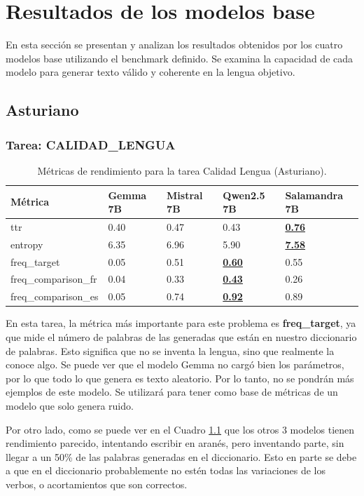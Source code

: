 \chapter{Resultados de los modelos base}
\label{ch:Resultados base}
En esta sección se presentan y analizan los resultados obtenidos por los cuatro modelos base utilizando el benchmark definido. Se examina la capacidad de cada modelo para generar texto válido y coherente en la lengua objetivo.

\section{Asturiano}

\subsection{Tarea: CALIDAD\_LENGUA}\label{tarea-calidad_lengua}
\begin{longtable}[]{@{}lllll@{}}
\toprule\noalign{}
Métrica & Gemma 7B & Mistral 7B & Qwen2.5 7B & Salamandra 7B \\
\midrule\noalign{}
\endhead
\bottomrule\noalign{}
\caption{Métricas de rendimiento para la tarea Calidad Lengua (Asturiano).}
\label{tab:metricas_Calidad Lengua_Asturiano}
\endlastfoot
ttr & 0.40 & 0.47 & 0.43 & \textbf{\underline{0.76}} \\
entropy & 6.35 & 6.96 & 5.90 & \textbf{\underline{7.58}} \\
freq\_target & 0.05 & 0.51 & \textbf{\underline{0.60}} & 0.55 \\
freq\_comparison\_fr & 0.04 & 0.33 & \textbf{\underline{0.43}} & 0.26 \\
freq\_comparison\_es & 0.05 & 0.74 & \textbf{\underline{0.92}} & 0.89 \\
\end{longtable}


En esta tarea, la métrica más importante para este problema es \textbf{freq\_target}, ya que mide el número de palabras de las generadas que están en nuestro diccionario de palabras. Esto significa que no se inventa la lengua, sino que realmente la conoce algo. Se puede ver que el modelo Gemma no cargó bien los parámetros, por lo que todo lo que genera es texto aleatorio. Por lo tanto, no se pondrán más ejemplos de este modelo. Se utilizará para tener como base de métricas de un modelo que solo genera ruido.

Por otro lado, como se puede ver en el Cuadro \ref{tab:metricas_Calidad Lengua_Asturiano} que los otros 3 modelos tienen rendimiento parecido, intentando escribir en aranés, pero inventando parte, sin llegar a un 50\% de las palabras generadas en el diccionario. Esto en parte se debe a que en el diccionario probablemente no estén todas las variaciones de los verbos, o acortamientos que son correctos.

